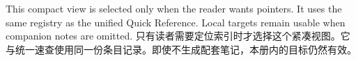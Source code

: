 \documentclass[10pt,twoside]{article}
\begin{document}
 {This compact view is selected only when the reader wants pointers. It uses the same registry as the unified Quick Reference. Local targets remain usable when companion notes are omitted.}
 {只有读者需要定位索引时才选择这个紧凑视图。它与统一速查使用同一份条目记录。即使不生成配套笔记，本册内的目标仍然有效。}
\StudyPrintKeywordIndex
\end{document}
